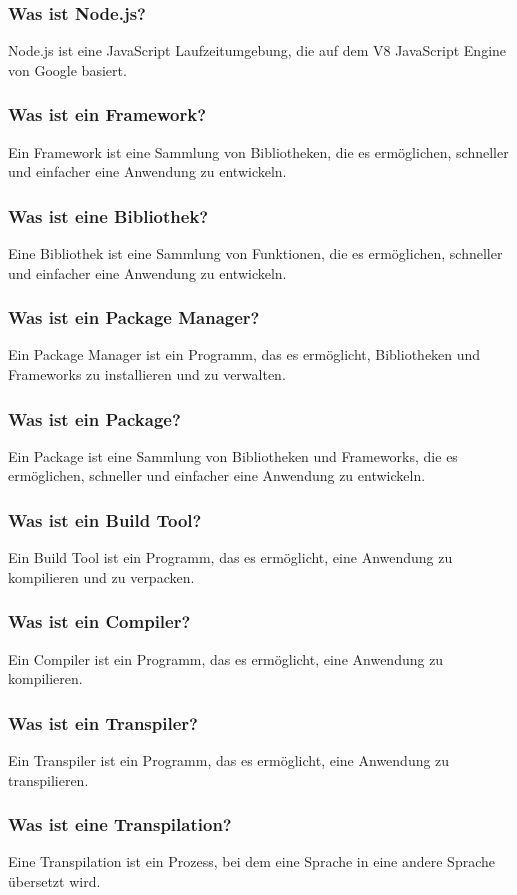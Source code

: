 \subsubsection{Was ist Node.js?}
Node.js ist eine JavaScript Laufzeitumgebung, die auf dem V8 JavaScript Engine von Google basiert.
\subsubsection{Was ist ein Framework?}
Ein Framework ist eine Sammlung von Bibliotheken, die es ermöglichen, schneller und einfacher eine Anwendung zu entwickeln.
\subsubsection{Was ist eine Bibliothek?}
Eine Bibliothek ist eine Sammlung von Funktionen, die es ermöglichen, schneller und einfacher eine Anwendung zu entwickeln.
\subsubsection{Was ist ein Package Manager?}
Ein Package Manager ist ein Programm, das es ermöglicht, Bibliotheken und Frameworks zu installieren und zu verwalten.
\subsubsection{Was ist ein Package?}
Ein Package ist eine Sammlung von Bibliotheken und Frameworks, die es ermöglichen, schneller und einfacher eine Anwendung zu entwickeln.
\subsubsection{Was ist ein Build Tool?}
Ein Build Tool ist ein Programm, das es ermöglicht, eine Anwendung zu kompilieren und zu verpacken.
\subsubsection{Was ist ein Compiler?}
Ein Compiler ist ein Programm, das es ermöglicht, eine Anwendung zu kompilieren.
\subsubsection{Was ist ein Transpiler?}
Ein Transpiler ist ein Programm, das es ermöglicht, eine Anwendung zu transpilieren.
\subsubsection{Was ist eine Transpilation?}
Eine Transpilation ist ein Prozess, bei dem eine Sprache in eine andere Sprache übersetzt wird.

